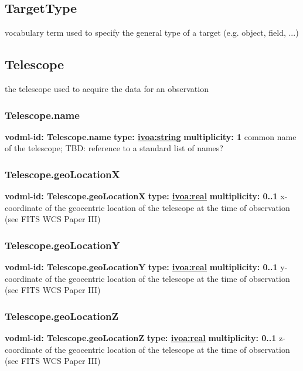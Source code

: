   \subsection{TargetType}
  \label{sect:TargetType}
    vocabulary term used to specify the general type of a target (e.g. object, field, ...)

  \subsection{Telescope}
  \label{sect:Telescope}
    the telescope used to acquire the data for an observation

    \subsubsection{Telescope.name}
      \textbf{vodml-id: Telescope.name} \newline
      \textbf{type: \hyperref[sect:ivoa]{ivoa:string}} \newline
      \textbf{multiplicity: 1} \newline
      common name of the telescope; TBD: reference to a standard list of names?

    \subsubsection{Telescope.geoLocationX}
      \textbf{vodml-id: Telescope.geoLocationX} \newline
      \textbf{type: \hyperref[sect:ivoa]{ivoa:real}} \newline
      \textbf{multiplicity: 0..1} \newline
      x-coordinate of the geocentric location of the telescope at the time of observation (see FITS WCS Paper III)

    \subsubsection{Telescope.geoLocationY}
      \textbf{vodml-id: Telescope.geoLocationY} \newline
      \textbf{type: \hyperref[sect:ivoa]{ivoa:real}} \newline
      \textbf{multiplicity: 0..1} \newline
      y-coordinate of the geocentric location of the telescope at the time of observation (see FITS WCS Paper III)

    \subsubsection{Telescope.geoLocationZ}
      \textbf{vodml-id: Telescope.geoLocationZ} \newline
      \textbf{type: \hyperref[sect:ivoa]{ivoa:real}} \newline
      \textbf{multiplicity: 0..1} \newline
      z-coordinate of the geocentric location of the telescope at the time of observation (see FITS WCS Paper III)

